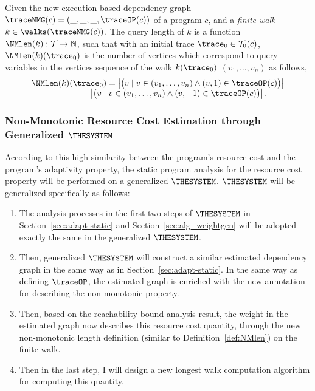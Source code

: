\begin{enumerate}
{\begin{defn}
 \label{def:NMlen}
 Given 
 the new execution-based dependency graph $\traceNMG({c}) = (\_, \_, \_, \traceOP({c}))$ of a program $c$,
 and a \emph{finite walk} 
 $k \in \walks(\traceNMG(c))$. 
 The query length of $k$ is a function $\NMlen(k): \mathcal{T} \to \mathbb{N}$, such that with an initial trace $\trace_0 \in \mathcal{T}_0(c)$, $\NMlen(k)(\trace_0)$ is
 the number of vertices which correspond to query variables in the vertices sequence of the walk $k(\trace_0)$
 $(v_1, \ldots, v_{n})$ as follows, 
 \[
     \begin{array}{l}
        \NMlen(k)(\trace_0) = 
        \left\vert \big( v \mid v \in (v_1, \ldots, v_{n}) \land (v, 1) \in \traceOP(c) \big) \right \vert
        \\ \qquad \qquad \qquad
        - 
        \left\vert \big( v \mid v \in (v_1, \ldots, v_{n}) \land (v, -1) \in \traceOP(c) \big) \right \vert.
    \end{array}
 \]
 \end{defn}}
\end{enumerate}
\subsubsection{Non-Monotonic Resource Cost Estimation through Generalized $\THESYSTEM$}
According to this high similarity between the program's resource cost and the 
program's adaptivity property, the static program analysis for the resource cost property will 
be performed on a generalized $\THESYSTEM$. $\THESYSTEM$ will be generalized specifically as follows:
\begin{enumerate}
 \item The analysis processes in the first two steps of $\THESYSTEM$ in Section~\ref{sec:adapt-static}
 and Section~\ref{sec:alg_weightgen} will be adopted exactly the same in the generalized $\THESYSTEM$.
 \item Then, generalized $\THESYSTEM$ will construct a similar estimated dependency graph 
 in the same way as in Section~\ref{sec:adapt-static}. 
 In the same way as defining $\traceOP$, 
 the estimated graph is enriched with the new annotation for describing the non-monotonic property.
 \item Then, based on the reachability bound analysis result, the weight in the estimated graph
 now describes this resource cost quantity,
  through the new non-monotonic length definition (similar to Definition~\ref{def:NMlen}) on the finite walk.
 \item Then in the last step, I will design a new longest walk computation algorithm for computing this quantity.
\end{enumerate}

